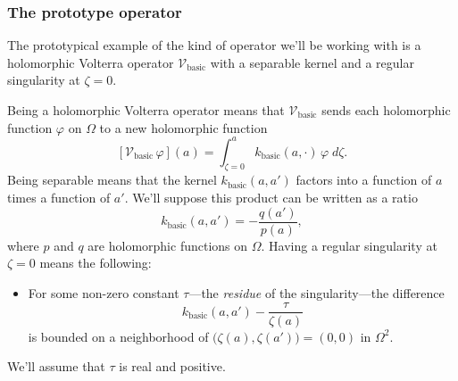 \documentclass{article}
\makeatletter
\theoremstyle{plain}
\newcommand{\condconst}[2]{\item[($\text{\textsc{#1}} \mid #2$)]\protected@edef\@currentlabel{$\text{\textsc{#1}} \mid #2$}}
\newcommand{\hardpart}{\mathcal{V}_\text{basic}}
\newcommand{\hardker}{k_\text{basic}}
\newcommand{\domain}{\Omega}
\makeatother
\begin{document}
\subsubsection{The prototype operator}\label{setting:basic}
The prototypical example of the kind of operator we'll be working with is a holomorphic Volterra operator $\hardpart$ with a separable kernel and a regular singularity at $\zeta = 0$.

Being a holomorphic Volterra operator means that $\hardpart$ sends each holomorphic function $\varphi$ on $\domain$ to a new holomorphic function
\[ [\hardpart\,\varphi](a) = \int_{\zeta = 0}^a \hardker(a, \cdot)\,\varphi\;d\zeta. \]
Being separable means that the kernel $\hardker(a, a')$ factors into a function of $a$ times a function of $a'$. We'll suppose this product can be written as a ratio
\[ \hardker(a, a') = - \frac{q(a')}{p(a)}, \]
where $p$ and $q$ are holomorphic functions on $\domain$. Having a regular singularity at $\zeta = 0$ means the following:
\begin{itemize}
\condconst{sing}{\tau}\label{cond:sing} For some non-zero constant $\tau$---the {\em residue} of the singularity---the difference
\[ \hardker(a, a') - \frac{\tau}{\zeta(a)} \]
is bounded on a neighborhood of $\big(\zeta(a), \zeta(a')\big) = (0, 0)$ in $\domain^2$.
\end{itemize}
We'll assume that $\tau$ is real and positive.
\end{document}
